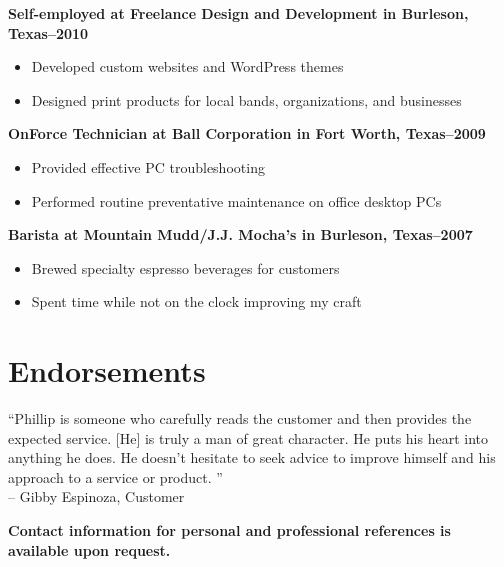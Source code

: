 \documentclass[margin]{res}
\newcommand{\sectionspace}{\vspace{10pt}}
\begin{document}
\begin{resume}
                \textbf{Self-employed
                 at Freelance Design and Development in Burleson, Texas--2010}
                 \vspace{-10pt}\begin{itemize} \itemsep -2pt %
                   \item Developed custom websites and WordPress themes
                 
                   \item Designed print products for local bands, organizations, and businesses
                 \end{itemize}
              
                \textbf{OnForce Technician
                 at Ball Corporation in Fort Worth, Texas--2009}
                 \vspace{-10pt}\begin{itemize} \itemsep -2pt %
                   \item Provided effective PC troubleshooting
                 
                   \item Performed routine preventative maintenance on office desktop PCs
                 \end{itemize}
              
                \textbf{Barista
                 at Mountain Mudd/J.J. Mocha's in Burleson, Texas--2007}
                 \vspace{-10pt}\begin{itemize} \itemsep -2pt %
                   \item Brewed specialty espresso beverages for customers
                 
                   \item Spent time while not on the clock improving my craft
                 \end{itemize}
              

\sectionspace


\section{
Endorsements}

              
                ``Phillip is someone who carefully reads the customer and then provides the
expected service. [He] is truly a man of great character. He puts his
heart into anything he does. He doesn't hesitate to seek advice to improve
himself and his approach to a service or product.
''                    \\
                -- Gibby Espinoza, Customer
              

\sectionspace


\sectionspace


\textbf{\footnotesize Contact information for personal and professional references is available upon request.}


\end{resume}
\end{document}
